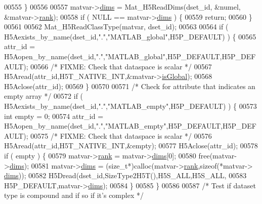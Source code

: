 \begin{DoxyCode}
00555     \}
00556 
00557     matvar->\hyperlink{group___m_a_t_a8e01234e1c862ce3472bb37f5a09b92c}{dims} = Mat\_H5ReadDims(dset\_id, &numel, &matvar->\hyperlink{group___m_a_t_a84ba70c96ded13cc555fa75b768d9921}{rank});
00558     \textcolor{keywordflow}{if} ( NULL == matvar->\hyperlink{group___m_a_t_a8e01234e1c862ce3472bb37f5a09b92c}{dims} ) \{
00559         \textcolor{keywordflow}{return};
00560     \}
00561 
00562     Mat\_H5ReadClassType(matvar, dset\_id);
00563 
00564     \textcolor{keywordflow}{if} ( H5Aexists\_by\_name(dset\_id,\textcolor{stringliteral}{"."},\textcolor{stringliteral}{"MATLAB\_global"},H5P\_DEFAULT) ) \{
00565         attr\_id = H5Aopen\_by\_name(dset\_id,\textcolor{stringliteral}{"."},\textcolor{stringliteral}{"MATLAB\_global"},H5P\_DEFAULT,H5P\_DEFAULT);
00566         \textcolor{comment}{/* FIXME: Check that dataspace is scalar */}
00567         H5Aread(attr\_id,H5T\_NATIVE\_INT,&matvar->\hyperlink{group___m_a_t_af26c71c4c0ddb14931d15910dddac1bc}{isGlobal});
00568         H5Aclose(attr\_id);
00569     \}
00570 
00571     \textcolor{comment}{/* Check for attribute that indicates an empty array */}
00572     \textcolor{keywordflow}{if} ( H5Aexists\_by\_name(dset\_id,\textcolor{stringliteral}{"."},\textcolor{stringliteral}{"MATLAB\_empty"},H5P\_DEFAULT) ) \{
00573         \textcolor{keywordtype}{int} empty = 0;
00574         attr\_id = H5Aopen\_by\_name(dset\_id,\textcolor{stringliteral}{"."},\textcolor{stringliteral}{"MATLAB\_empty"},H5P\_DEFAULT,H5P\_DEFAULT);
00575         \textcolor{comment}{/* FIXME: Check that dataspace is scalar */}
00576         H5Aread(attr\_id,H5T\_NATIVE\_INT,&empty);
00577         H5Aclose(attr\_id);
00578         \textcolor{keywordflow}{if} ( empty ) \{
00579             matvar->\hyperlink{group___m_a_t_a84ba70c96ded13cc555fa75b768d9921}{rank} = matvar->\hyperlink{group___m_a_t_a8e01234e1c862ce3472bb37f5a09b92c}{dims}[0];
00580             free(matvar->\hyperlink{group___m_a_t_a8e01234e1c862ce3472bb37f5a09b92c}{dims});
00581             matvar->\hyperlink{group___m_a_t_a8e01234e1c862ce3472bb37f5a09b92c}{dims} = (\textcolor{keywordtype}{size\_t}*)calloc(matvar->\hyperlink{group___m_a_t_a84ba70c96ded13cc555fa75b768d9921}{rank},\textcolor{keyword}{sizeof}(*matvar->
      \hyperlink{group___m_a_t_a8e01234e1c862ce3472bb37f5a09b92c}{dims}));
00582             H5Dread(dset\_id,SizeType2H5T(),H5S\_ALL,H5S\_ALL,
00583                     H5P\_DEFAULT,matvar->\hyperlink{group___m_a_t_a8e01234e1c862ce3472bb37f5a09b92c}{dims});
00584         \}
00585     \}
00586 
00587     \textcolor{comment}{/* Test if dataset type is compound and if so if it's complex */}

\end{DoxyCode}

